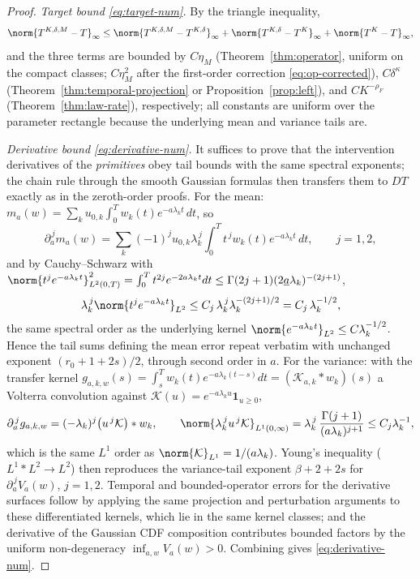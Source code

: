 \closuredraft
\begin{proof}
\emph{Target bound \eqref{eq:target-num}.} By the triangle inequality,
\[
 \norm{T^{K,\delta,M}-T}_\infty
 \le\norm{T^{K,\delta,M}-T^{K,\delta}}_\infty
 +\norm{T^{K,\delta}-T^{K}}_\infty
 +\norm{T^{K}-T}_\infty,
\]
and the three terms are bounded by $C\eta_M$ (Theorem~\ref{thm:operator},
uniform on the compact classes; $C\eta_M^2$ after the first-order
correction \eqref{eq:op-corrected}), $C\delta^\kappa$
(Theorem~\ref{thm:temporal-projection} or Proposition~\ref{prop:left}), and
$CK^{-\rho_F}$ (Theorem~\ref{thm:law-rate}), respectively; all constants are
uniform over the parameter rectangle because the underlying mean and
variance tails are.

\emph{Derivative bound \eqref{eq:derivative-num}.} It suffices to prove that
the intervention derivatives of the \emph{primitives} obey tail bounds with
the same spectral exponents; the chain rule through the smooth Gaussian
formulas then transfers them to $DT$ exactly as in the zeroth-order proofs.
For the mean: $m_a(w)=\sum_ku_{0,k}\int_0^Tw_k(t)e^{-a\lambda_kt}\,dt$, so
\[
 \partial_a^{\,j}m_a(w)
 =\sum_k(-1)^ju_{0,k}\lambda_k^{\,j}\int_0^Tt^{\,j}w_k(t)
 e^{-a\lambda_kt}\,dt,
 \qquad j=1,2,
\]
and by Cauchy--Schwarz with
$\norm{t^je^{-a\lambda_kt}}_{L^2(0,T)}^2
=\int_0^Tt^{2j}e^{-2a\lambda_kt}dt
\le\Gamma(2j+1)(2\underline a\lambda_k)^{-(2j+1)}$,
\[
 \lambda_k^{\,j}\norm{t^je^{-a\lambda_kt}}_{L^2}
 \le C_j\,\lambda_k^{\,j}\lambda_k^{-(2j+1)/2}
 =C_j\,\lambda_k^{-1/2},
\]
the same spectral order as the underlying kernel
$\norm{e^{-a\lambda_kt}}_{L^2}\le C\lambda_k^{-1/2}$. Hence the tail sums
defining the mean error repeat verbatim with unchanged exponent
$(r_0+1+2s)/2$, through second order in $a$.
For the variance: with the transfer kernel
$g_{a,k,w}(s)=\int_s^Tw_k(t)e^{-a\lambda_k(t-s)}dt=(\mathcal K_{a,k}\ast
w_k)(s)$ a Volterra convolution against $\mathcal K(u)=e^{-a\lambda_ku}
\mathbf 1_{u\ge0}$,
\[
 \partial_a^{\,j}g_{a,k,w}
 =(-\lambda_k)^j\big(u^{\,j}\mathcal K\big)\ast w_k,
 \qquad
 \norm{\lambda_k^{\,j}u^{\,j}\mathcal K}_{L^1(0,\infty)}
 =\lambda_k^{\,j}\,\frac{\Gamma(j+1)}{(a\lambda_k)^{j+1}}
 \le C_j\lambda_k^{-1},
\]
which is the same $L^1$ order as
$\norm{\mathcal K}_{L^1}=1/(a\lambda_k)$. Young's inequality
($L^1\ast L^2\to L^2$) then reproduces the variance-tail exponent
$\beta+2+2s$ for $\partial_a^{\,j}V_a(w)$, $j=1,2$. Temporal and
bounded-operator errors for the derivative surfaces follow by applying the
same projection and perturbation arguments to these differentiated kernels,
which lie in the same kernel classes; and the derivative of the Gaussian CDF
composition contributes bounded factors by the uniform non-degeneracy
$\inf_{a,w}V_a(w)>0$. Combining gives \eqref{eq:derivative-num}.
\end{proof}
